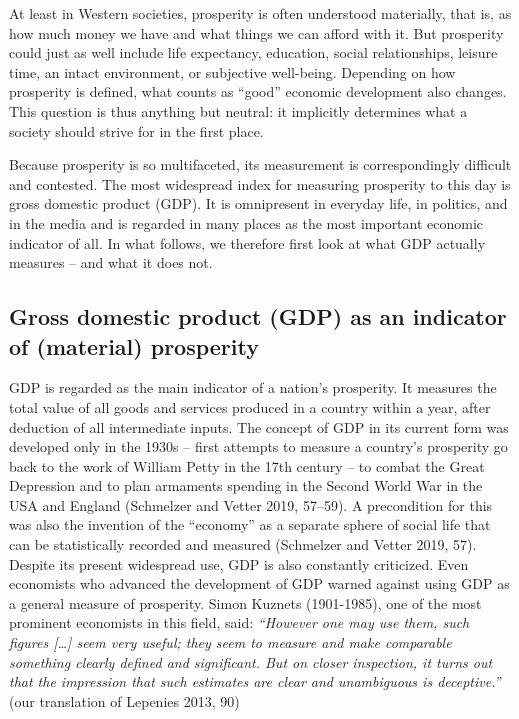 \documentclass[
  british,
  a4paper,
  DIV=11,
  numbers=noendperiod,
  oneside,
  openany]{scrreprt}
\begin{document}
At least in Western societies, prosperity is often understood
materially, that is, as how much money we have and what things we can
afford with it. But prosperity could just as well include life
expectancy, education, social relationships, leisure time, an intact
environment, or subjective well-being. Depending on how prosperity is
defined, what counts as ``good'' economic development also changes. This
question is thus anything but neutral: it implicitly determines what a
society should strive for in the first place.

Because prosperity is so multifaceted, its measurement is
correspondingly difficult and contested. The most widespread index for
measuring prosperity to this day is gross domestic product (GDP). It is
omnipresent in everyday life, in politics, and in the media and is
regarded in many places as the most important economic indicator of all.
In what follows, we therefore first look at what GDP actually measures
-- and what it does not.

\subsection{Gross domestic product (GDP) as an indicator of (material)
prosperity}\label{gross-domestic-product-gdp-as-an-indicator-of-material-prosperity}

GDP is regarded as the main indicator of a nation's prosperity. It
measures the total value of all goods and services produced in a country
within a year, after deduction of all intermediate inputs. The concept
of GDP in its current form was developed only in the 1930s -- first
attempts to measure a country's prosperity go back to the work of
William Petty in the 17th century -- to combat the Great Depression and
to plan armaments spending in the Second World War in the USA and
England (Schmelzer and Vetter 2019, 57--59). A precondition for this was
also the invention of the ``economy'' as a separate sphere of social
life that can be statistically recorded and measured (Schmelzer and
Vetter 2019, 57). Despite its present widespread use, GDP is also
constantly criticized. Even economists who advanced the development of
GDP warned against using GDP as a general measure of prosperity. Simon
Kuznets (1901-1985), one of the most prominent economists in this field,
said: \emph{``However one may use them, such figures {[}\ldots{]} seem
very useful; they seem to measure and make comparable something clearly
defined and significant. But on closer inspection, it turns out that the
impression that such estimates are clear and unambiguous is
deceptive.''} (our translation of Lepenies 2013, 90)
\end{document}

